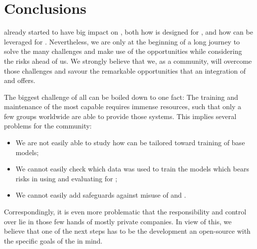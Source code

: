 \section{Conclusions}
\label{llm-sec:conclusion}

\LLMs already started to have big impact on \AutoML, both how \AutoML is designed for \LLMs, and how \LLMs can be leveraged for \AutoML. 
Nevertheless, we are only at the beginning of a long journey to solve the many challenges and make use of the opportunities while considering the risks ahead of us. We strongly believe that we, as a community, will overcome those challenges and savour the remarkable opportunities that an integration of \LLMs and \AutoML offers.

The biggest challenge of all can be boiled down to one fact: The training and maintenance of the most capable \LLMs requires immense resources, such that only a few groups worldwide are able to provide those systems. This implies several problems for the community: \begin{itemize}[(i)]
    \item We are not easily able to study how \AutoML can be tailored toward training of \LLM base models;
    \item We cannot easily check which data was used to train the models which bears risks in using and evaluating \LLMs for \AutoML;
    \item We cannot easily add safeguards against misuse of \LLMs and \AutoML.
\end{itemize}
Correspondingly, it is even more problematic that the responsibility and control over \LLMs lie in those few hands of mostly private companies. In view of this, we believe that one of the next steps has to be the development an open-source \LLM with the specific goals of the \AutoML in mind.
